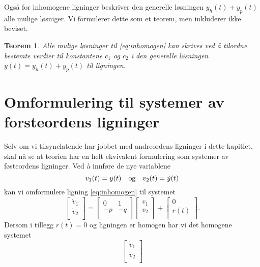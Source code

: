 \documentclass{article}
\newtheorem{thm}{Teorem}\surroundwithmdframed{thm}
\theoremstyle{definition}
\theoremstyle{remark}
\begin{document}
\begin{multicols*}{2}
Også for inhomogene ligninger beskriver den generelle løsningen $y_h(t) + y_p(t)$ alle mulige løsniger. Vi formulerer dette som et teorem, men inkluderer ikke beviset.

\begin{thm} \label{thm:alle_mulige_losn_inhomogen}
  Alle mulige løsninger til \eqref{eq:inhomogen} kan skrives ved å tilordne bestemte verdier til konstantene $c_1$ og $c_2$ i den generelle løsningen $y(t) = y_h(t) + y_p(t)$ til ligningen.
\end{thm}


\section*{Omformulering til systemer av forsteordens ligninger}
Selv om vi tilsynelatende har jobbet med andreordens ligninger i dette kapitlet, skal nå se at teorien har en helt ekvivalent formulering som systemer av føsteordens ligninger. Ved å innføre de nye variablene
\begin{equation*}
  v_1(t) = y(t)\ \ \textnormal{ og }\ \ v_2(t) = \dot{y}(t)
\end{equation*}
kan vi omformulere ligning \eqref{eq:inhomogen} til systemet
\begin{equation*}
  \begin{bmatrix}
    \dot{v}_1 \\
    \dot{v}_2 \\
  \end{bmatrix}
  =
  \begin{bmatrix}
    0 & 1 \\
    -p & -q \\
  \end{bmatrix}
  \begin{bmatrix}
    v_1 \\
    v_2 \\
  \end{bmatrix}
  +
  \begin{bmatrix}
    0 \\
    r(t) \\
  \end{bmatrix}.
\end{equation*}
Dersom i tillegg $r(t) = 0$ og ligningen er homogen har vi det homogene systemet
\begin{equation*}
  \begin{bmatrix}
    \dot{v}_1 \\
    \dot{v}_2 \\
  \end{bmatrix}

\end{equation*}
\end{multicols*}
\end{document}
